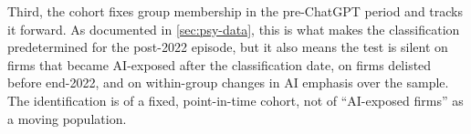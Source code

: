Third, the cohort fixes group membership in the pre-ChatGPT period
and tracks it forward. As documented in \cref{sec:psy-data}, this is
what makes the classification predetermined for the post-2022
episode, but it also means the test is silent on firms that became
AI-exposed after the classification date, on firms delisted before
end-2022, and on within-group changes in AI emphasis over the
sample. The identification is of a fixed, point-in-time cohort, not
of ``AI-exposed firms'' as a moving population.